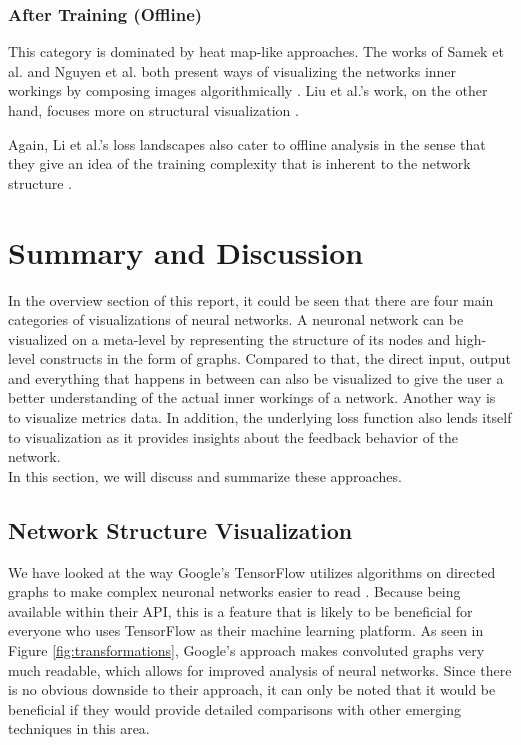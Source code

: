 \documentclass{acmsiggraph}               %
\begin{document}
\subsubsection{After Training (Offline)}
This category is dominated by heat map-like approaches. The works of Samek et al. and Nguyen et al. both present ways of visualizing the networks inner workings by composing images algorithmically \cite{Samek2017,Nguyen2016}. 
Liu et al.'s work, on the other hand, focuses more on structural visualization \cite{Liu2016}.

Again, Li et al.'s loss landscapes also cater to offline analysis in the sense that they give an idea of the training complexity that is inherent to the network structure \cite{Li2017}.

\section{Summary and Discussion}
In the overview section of this report, it could be seen that there are four main categories of visualizations of neural networks. A neuronal network can be visualized on a meta-level by representing the structure of its nodes and high-level constructs in the form of graphs. Compared to that, the direct input, output and everything that happens in between can also be visualized to give the user a better understanding of the actual inner workings of a network. Another way is to visualize metrics data. In addition, the underlying loss function also lends itself to visualization as it provides insights about the feedback behavior of the network.\\
In this section, we will discuss and summarize these approaches.\\

\subsection{Network Structure Visualization}

We have looked at the way Google's TensorFlow utilizes algorithms on directed graphs to make complex neuronal networks easier to read \cite{Wongsuphasawat2018}. Because being available within their API, this is a feature that is likely to be beneficial for everyone who uses TensorFlow as their machine learning platform. As seen in Figure \ref{fig:transformations}, Google's approach makes convoluted graphs very much readable, which allows for improved analysis of neural networks. Since there is no obvious downside to their approach, it can only be noted that it would be beneficial if they would provide detailed comparisons with other emerging techniques in this area.
\end{document}
